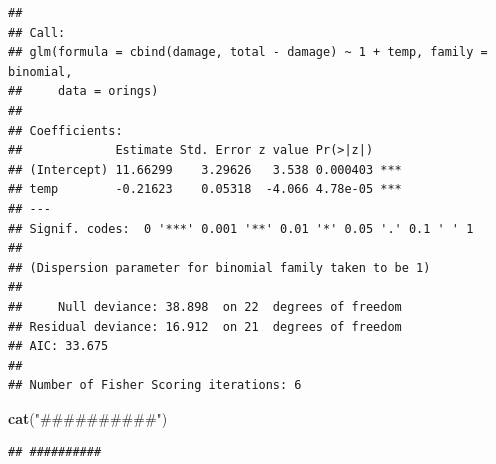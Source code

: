 \documentclass[
]{book}
\newenvironment{Shaded}{\begin{snugshade}}{\end{snugshade}}
\newcommand{\FunctionTok}[1]{\textcolor[rgb]{0.13,0.29,0.53}{\textbf{#1}}}
\newcommand{\NormalTok}[1]{#1}
\newcommand{\StringTok}[1]{\textcolor[rgb]{0.31,0.60,0.02}{#1}}
\begin{document}
\begin{verbatim}
## 
## Call:
## glm(formula = cbind(damage, total - damage) ~ 1 + temp, family = binomial, 
##     data = orings)
## 
## Coefficients:
##             Estimate Std. Error z value Pr(>|z|)    
## (Intercept) 11.66299    3.29626   3.538 0.000403 ***
## temp        -0.21623    0.05318  -4.066 4.78e-05 ***
## ---
## Signif. codes:  0 '***' 0.001 '**' 0.01 '*' 0.05 '.' 0.1 ' ' 1
## 
## (Dispersion parameter for binomial family taken to be 1)
## 
##     Null deviance: 38.898  on 22  degrees of freedom
## Residual deviance: 16.912  on 21  degrees of freedom
## AIC: 33.675
## 
## Number of Fisher Scoring iterations: 6
\end{verbatim}

\begin{Shaded}
\begin{Highlighting}[]
\FunctionTok{cat}\NormalTok{(}\StringTok{"\#\#\#\#\#\#\#\#\#\#"}\NormalTok{)}
\end{Highlighting}
\end{Shaded}

\begin{verbatim}
## ##########
\end{verbatim}
\end{document}
